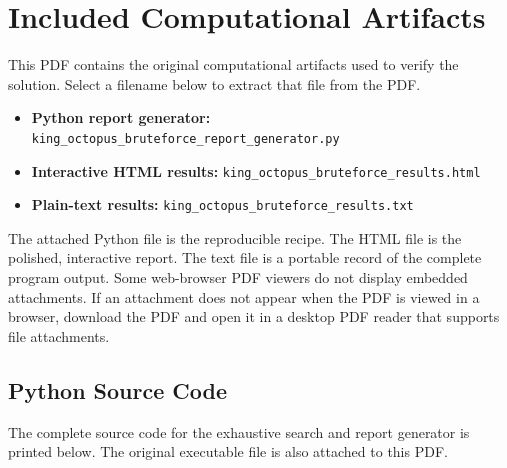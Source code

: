 \documentclass[11pt]{article}
\begin{document}
\section*{Included Computational Artifacts} This PDF contains the original computational artifacts used to verify the solution. Select a filename below to extract that file from the PDF. \begin{itemize} \item \textbf{Python report generator:}  {\texttt{king\_octopus\_bruteforce\_report\_generator.py}} \item \textbf{Interactive HTML results:}  {\texttt{king\_octopus\_bruteforce\_results.html}} \item \textbf{Plain-text results:}  {\texttt{king\_octopus\_bruteforce\_results.txt}} \end{itemize} The attached Python file is the reproducible recipe. The HTML file is the polished, interactive report. The text file is a portable record of the complete program output. Some web-browser PDF viewers do not display embedded attachments. If an attachment does not appear when the PDF is viewed in a browser, download the PDF and open it in a desktop PDF reader that supports file attachments.

\subsection*{Python Source Code} The complete source code for the exhaustive search and report generator is printed below. The original executable file is also attached to this PDF. 
\end{document}
